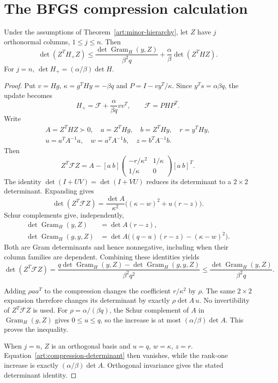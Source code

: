 \section{The BFGS compression calculation}\label{art:matrix-algebra}

\begin{lemma}\label{art:gram-compression}
Under the assumptions of Theorem~\ref{art:minor-hierarchy}, let $Z$ have
$j$ orthonormal columns, $1\le j\le n$. Then
\[
 \det(Z^TH_+Z)\le
 \frac{\det\operatorname{Gram}_H(y,Z)}{\beta^2q}
       +\frac\alpha\beta\det(Z^THZ).
\]
For $j=n$, $\det H_+=(\alpha/\beta)\det H$.
\end{lemma}
\begin{proof}
Put $v=Hg$, $\kappa=g^THy=-\beta q$ and
$P=I-vy^T/\kappa$. Since $y^Ts=\alpha\beta q$, the update becomes
\[
 H_+=\mathcal F+\frac{\alpha}{\beta q}vv^T,
 \qquad \mathcal F=PHP^T.
\]
Write
\[
 \begin{gathered}
 A=Z^THZ\succ0,\quad a=Z^THg,\quad b=Z^THy,\quad r=y^THy,\\
 u=a^TA^{-1}a,\quad w=a^TA^{-1}b,\quad z=b^TA^{-1}b.
 \end{gathered}
\]
Then
\[
 Z^T\mathcal FZ
 =A-[a\ b]
 \begin{pmatrix}-r/\kappa^2&1/\kappa\\1/\kappa&0\end{pmatrix}
 [a\ b]^T.
\]
The identity $\det(I+UV)=\det(I+VU)$ reduces its determinant to a
$2\times2$ determinant. Expanding gives
\begin{equation}\label{art:compression-determinant}
 \det(Z^T\mathcal FZ)
 =\frac{\det A}{\kappa^2}
       \bigl((\kappa-w)^2+u(r-z)\bigr).
\end{equation}
Schur complements give, independently,
\begin{align*}
 \det\operatorname{Gram}_H(y,Z)&=\det A(r-z),\\
 \det\operatorname{Gram}_H(g,y,Z)
 &=\det A\bigl((q-u)(r-z)-(\kappa-w)^2\bigr).
\end{align*}
Both are Gram determinants and hence nonnegative, including when their
column families are dependent. Combining these identities yields
\[
 \det(Z^T\mathcal FZ)
 =\frac{q\det\operatorname{Gram}_H(y,Z)
             -\det\operatorname{Gram}_H(g,y,Z)}{\beta^2q^2}
 \le\frac{\det\operatorname{Gram}_H(y,Z)}{\beta^2q}.
\]

Adding $\rho aa^T$ to the compression changes the coefficient $r/\kappa^2$
by $\rho$. The same $2\times2$ expansion therefore changes its determinant
by exactly $\rho\det A\,u$. No invertibility of
$Z^T\mathcal FZ$ is used. For $\rho=\alpha/(\beta q)$, the Schur
complement of $A$ in $\operatorname{Gram}_H(g,Z)$ gives $0\le u\le q$,
so the increase is at most $(\alpha/\beta)\det A$.
This proves the inequality.

When $j=n$, $Z$ is an orthogonal basis and $u=q$, $w=\kappa$, $z=r$.
Equation~\eqref{art:compression-determinant} then vanishes, while the
rank-one increase is exactly $(\alpha/\beta)\det A$.
Orthogonal invariance gives the stated determinant identity.
\end{proof}
